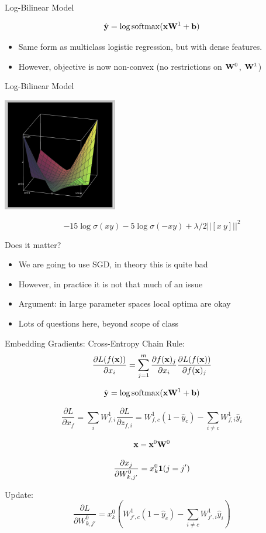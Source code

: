 \documentclass{beamer}
\begin{document}
\begin{frame}{Log-Bilinear Model}


  \[ \hat{\boldy} = \log \softmax (\boldx \boldW^1 + \boldb) \]

  \begin{itemize}
  \item Same form as multiclass logistic regression, but with dense features.
  \item However, objective is now non-convex (no restrictions on $\mathbf{W}^0$, $\mathbf{W}^1$)
  \end{itemize}
\end{frame}

\begin{frame}{Log-Bilinear Model}
  \begin{center}
    \includegraphics[width=5cm]{logbilinear}
  \end{center}
  \[-15\log \sigma(xy)-5\log\sigma(-xy) + \lambda/2 ||[x\ y]||^2 \]

\end{frame}


\begin{frame}{Does it matter?}
  \begin{itemize}
  \item We are going to use SGD, in theory this is quite bad
    \air
  \item However, in practice it is not that much of an issue
    \air
  \item Argument: in large parameter spaces local optima are okay
    \air
  \item Lots of questions here, beyond scope of class
  \end{itemize}
\end{frame}

\begin{frame}{Embedding Gradients: Cross-Entropy}
  Chain Rule:
  \[ \frac{\partial L(f(\mathbf{x}))}{\partial x_i} = \sum_{j =1}^m \frac{\partial f(\mathbf{x})_j} {\partial  x_i} \frac{\partial L(f(\mathbf{x}))} {\partial f(\mathbf{x})_j}   \]


  \[ \hat{\boldy} = \log \softmax (\boldx \boldW^1 + \boldb) \]

  \pause
  \[\frac{\partial L}{\partial x_{f}} =
    \sum_{i} W^1_{f, i} \frac{\partial L}{\partial z_{f, i}} =
     W^1_{f,c}  (1-\hat{y}_c)  - \sum_{i \neq c} W^1_{f,i}  \hat{y}_i
  \]

  \[ \mathbf{x} = \mathbf{x}^0 \mathbf{W}^0 \]

  \[\frac{\partial x_j}{\partial W^0_{k, j'}} = x^0_{k}  \mathbf{1}(j = j')  \]

  Update:
  \[\frac{\partial L}{\partial W^0_{k,j'}} = x^0_{k}      (W^1_{j',c} (1-\hat{y}_c)  - \sum_{i \neq c} W^1_{j',i}  \hat{y}_i)  \]
\end{frame}
\end{document}

